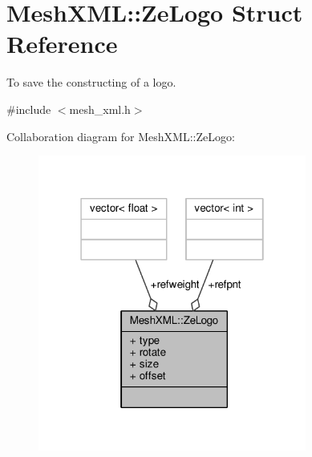 \hypertarget{structMeshXML_1_1ZeLogo}{}\section{Mesh\+X\+ML\+:\+:Ze\+Logo Struct Reference}
\label{structMeshXML_1_1ZeLogo}


To save the constructing of a logo.  




{\ttfamily \#include $<$mesh\+\_\+xml.\+h$>$}



Collaboration diagram for Mesh\+X\+ML\+:\+:Ze\+Logo\+:
\nopagebreak
\begin{figure}[H]
\begin{center}
\leavevmode
\includegraphics[width=250pt]{d3/d1e/structMeshXML_1_1ZeLogo__coll__graph}
\end{center}
\end{figure}
